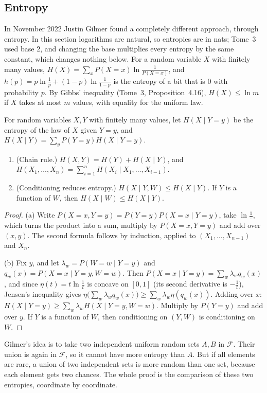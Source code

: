 \subsection{Entropy}

In November 2022 Justin Gilmer found a completely different approach, through entropy. In this section logarithms are natural, so entropies are in
nats; Tome~3 used base $2$, and changing the base multiplies every entropy by the same constant, which changes nothing below. For a random variable $X$
with finitely many values, $H(X)=\sum_xP(X=x)\ln\frac1{P(X=x)}$, and $h(p)=p\ln\frac1p+(1-p)\ln\frac1{1-p}$ is the entropy of a bit that is $0$ with
probability $p$. By Gibbs' inequality (Tome~3, Proposition~4.16), $H(X)\le\ln m$ if $X$ takes at most $m$ values, with equality for the uniform law.

For random variables $X,Y$ with finitely many values, let $H(X\mid Y=y)$ be the entropy of the law of $X$ given $Y=y$, and
$H(X\mid Y)=\sum_yP(Y=y)H(X\mid Y=y)$.

\begin{lemma}\label{lem:condent}
\begin{enumerate}[label=(\alph*)]
\item (Chain rule.) $H(X,Y)=H(Y)+H(X\mid Y)$, and $H(X_1,\dots,X_n)=\sum_{i=1}^nH(X_i\mid X_1,\dots,X_{i-1})$.
\item (Conditioning reduces entropy.) $H(X\mid Y,W)\le H(X\mid Y)$. If $Y$ is a function of $W$, then $H(X\mid W)\le H(X\mid Y)$.
\end{enumerate}
\end{lemma}
\begin{proof}
(a) Write $P(X=x,Y=y)=P(Y=y)P(X=x\mid Y=y)$, take $\ln\frac1{\,\cdot\,}$, which turns the product into a sum, multiply by $P(X=x,Y=y)$ and add over
$(x,y)$. The second formula follows by induction, applied to $(X_1,\dots,X_{n-1})$ and $X_n$.

(b) Fix $y$, and let $\lambda_w=P(W=w\mid Y=y)$ and $q_w(x)=P(X=x\mid Y=y,W=w)$. Then $P(X=x\mid Y=y)=\sum_w\lambda_wq_w(x)$, and since
$\eta(t)=t\ln\frac1t$ is concave on $[0,1]$ (its second derivative is $-\frac1t$), Jensen's inequality gives
$\eta\bigl(\sum_w\lambda_wq_w(x)\bigr)\ge\sum_w\lambda_w\eta(q_w(x))$. Adding over $x$: $H(X\mid Y=y)\ge\sum_w\lambda_wH(X\mid Y=y,W=w)$. Multiply by
$P(Y=y)$ and add over $y$. If $Y$ is a function of $W$, then conditioning on $(Y,W)$ is conditioning on $W$.
\end{proof}

Gilmer's idea is to take two independent uniform random sets $A,B$ in $\mathcal F$. Their union is again in $\mathcal F$, so it cannot have more entropy
than $A$. But if all elements are rare, a union of two independent sets is more random than one set, because each element gets two chances. The whole
proof is the comparison of these two entropies, coordinate by coordinate.

